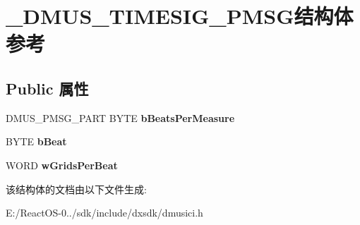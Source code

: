 \hypertarget{struct___d_m_u_s___t_i_m_e_s_i_g___p_m_s_g}{}\section{\+\_\+\+D\+M\+U\+S\+\_\+\+T\+I\+M\+E\+S\+I\+G\+\_\+\+P\+M\+S\+G结构体 参考}
\label{struct___d_m_u_s___t_i_m_e_s_i_g___p_m_s_g}
\subsection*{Public 属性}
\begin{DoxyCompactItemize}
\item 
\mbox{\label{struct___d_m_u_s___t_i_m_e_s_i_g___p_m_s_g_aa0b7683dc6c4c8e1f152a96d97ec46a7}} 
D\+M\+U\+S\+\_\+\+P\+M\+S\+G\+\_\+\+P\+A\+RT B\+Y\+TE {\bfseries b\+Beats\+Per\+Measure}
\item 
\mbox{\label{struct___d_m_u_s___t_i_m_e_s_i_g___p_m_s_g_adb87d1b25ba72737c7ac11163fbc893b}} 
B\+Y\+TE {\bfseries b\+Beat}
\item 
\mbox{\label{struct___d_m_u_s___t_i_m_e_s_i_g___p_m_s_g_ada8294718154d97753fd9bff81cc019d}} 
W\+O\+RD {\bfseries w\+Grids\+Per\+Beat}
\end{DoxyCompactItemize}


该结构体的文档由以下文件生成\+:\begin{DoxyCompactItemize}
\item 
E\+:/\+React\+O\+S-\/0../sdk/include/dxsdk/dmusici.\+h\end{DoxyCompactItemize}
